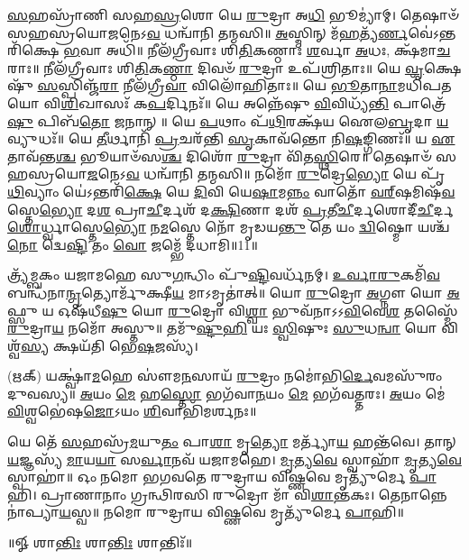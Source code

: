 \-\ul{𑌸}\-𑌹𑌸𑍍𑌰𑌾᳴𑌣𑌿 𑌸𑌹\-\ul{𑌸𑍍𑌰}\-𑌶𑍋 𑌯𑍇 \ul{𑌰𑍁}\-𑌦𑍍𑌰𑌾 𑌅\-\ul{𑌧𑌿} 𑌭𑍂𑌮𑍍𑌯𑌾॑𑌮𑍍। 𑌤𑍇𑌷𑌾𑍞᳴ 𑌸𑌹𑌸𑍍𑌰𑌯𑍋\-\ul{𑌜}\-𑌨𑍇𑌽\-\ul{𑌵} 𑌧𑌨𑍍𑌵𑌾᳴𑌨𑌿 𑌤𑌨𑍍𑌮𑌸𑌿॥ \ul{𑌅}\-𑌸𑍍𑌮𑌿𑌨𑍍 𑌮᳴\-\ul{𑌹}\-𑌤𑍍𑌯᳴\-\ul{𑌰𑍍𑌣}\-𑌵𑍇॑\-𑌽𑌨𑍍𑌤𑌰𑌿᳴𑌕𑍍𑌷𑍇 \ul{𑌭}\-𑌵𑌾 𑌅𑌧𑌿᳴॥ 𑌨𑍀𑌲᳴𑌗𑍍𑌰𑍀𑌵𑌾𑌃 𑌶𑌿\-\ul{𑌤𑌿}\-𑌕𑌣𑍍𑌠𑌾𑌃॑ \ul{𑌶}\-𑌰𑍍𑌵𑌾 \ul{𑌅}\-𑌧𑌃, 𑌕𑍍𑌷᳴𑌮𑌾\-\ul{𑌚}\-𑌰𑌾𑌃॥ 𑌨𑍀𑌲᳴𑌗𑍍𑌰𑍀𑌵𑌾𑌃 𑌶𑌿\-\ul{𑌤𑌿}\-𑌕\-\ul{𑌣𑍍𑌠𑌾} 𑌦𑌿𑌵𑍞᳴ \ul{𑌰𑍁}\-𑌦𑍍𑌰𑌾 𑌉𑌪᳴𑌶𑍍𑌰𑌿𑌤𑌾𑌃॥ 𑌯𑍇 \ul{𑌵𑍃}\-𑌕𑍍𑌷𑍇𑌷𑍁᳴ \ul{𑌸}\-𑌸𑍍𑌪𑌿𑌞𑍍𑌜᳴\-\ul{𑌰𑌾} 𑌨𑍀𑌲᳴𑌗𑍍𑌰𑍀\-\ul{𑌵𑌾} 𑌵𑌿𑌲𑍋᳴𑌹𑌿𑌤𑌾𑌃॥ 𑌯𑍇 \ul{𑌭𑍂}\-𑌤𑌾\-\ul{𑌨𑌾}\-𑌮𑌧𑌿᳴𑌪𑌤𑌯𑍋 𑌵𑌿\-\ul{𑌶𑌿}\-𑌖𑌾𑌸𑌃᳴ 𑌕\-\ul{𑌪}\-𑌰𑍍𑌦𑌿𑌨𑌃᳴॥ 𑌯𑍇 𑌅𑌨𑍍𑌨𑍇᳴𑌷𑍁 \ul{𑌵𑌿}\-𑌵𑌿𑌧𑍍𑌯᳴\-\ul{𑌨𑍍𑌤𑌿} 𑌪𑌾𑌤𑍍𑌰𑍇᳴\-\ul{𑌷𑍁} 𑌪𑌿𑌬᳴\-\ul{𑌤𑍋} 𑌜𑌨𑌾𑌨𑍍॥ 𑌯𑍇 \ul{𑌪}\-𑌥𑌾𑌂 𑌪᳴\-\ul{𑌥𑌿}\-𑌰𑌕𑍍𑌷᳴𑌯 𑌐𑌲\-\ul{𑌬𑍃}\-𑌦𑌾 \ul{𑌯}\-𑌵𑍍𑌯𑍁𑌧𑌃᳴॥ 𑌯𑍇 \ul{𑌤𑍀}\-𑌰𑍍𑌥𑌾𑌨𑌿᳴ \ul{𑌪𑍍𑌰}\-𑌚𑌰᳴𑌨𑍍𑌤𑌿 \ul{𑌸𑍃}\-𑌕𑌾𑌵᳴𑌨𑍍𑌤𑍋 𑌨𑌿\-\ul{𑌷}\-𑌙𑍍𑌗𑌿𑌣𑌃᳴॥ 𑌯 \ul{𑌏}\-𑌤𑌾𑌵᳴𑌨𑍍𑌤\-\ul{𑌶𑍍𑌚} 𑌭𑍂𑌯𑌾𑍞᳴𑌸\-\ul{𑌶𑍍𑌚} 𑌦𑌿𑌶𑍋᳴ \ul{𑌰𑍁}\-𑌦𑍍𑌰𑌾 𑌵𑌿᳴𑌤\-\ul{𑌸𑍍𑌥𑌿}\-𑌰𑍇॥ 𑌤𑍇𑌷𑌾𑍞᳴ 𑌸𑌹𑌸𑍍𑌰𑌯𑍋\-\ul{𑌜}\-𑌨𑍇𑌽\-\ul{𑌵} 𑌧𑌨𑍍𑌵𑌾᳴𑌨𑌿 𑌤𑌨𑍍𑌮𑌸𑌿॥ 𑌨𑌮𑍋᳴ \ul{𑌰𑍁}\-𑌦𑍍𑌰𑍇\-\ul{𑌭𑍍𑌯𑍋} 𑌯𑍇 𑌪𑍃᳴\-\ul{𑌥𑌿}\-𑌵𑍍𑌯𑌾𑌂 𑌯𑍇॑𑌽𑌨𑍍𑌤𑌰𑌿᳴\-\ul{𑌕𑍍𑌷𑍇} 𑌯𑍇 \ul{𑌦𑌿}\-𑌵𑌿 𑌯𑍇\-\ul{𑌷𑌾}\-𑌮\-\ul{𑌨𑍍𑌨𑌂} 𑌵𑌾𑌤𑍋᳴ \ul{𑌵}\-\ul{𑌰𑍍}‌𑌷𑌮𑌿𑌷᳴\-\ul{𑌵}\-𑌸𑍍𑌤𑍇\-\ul{𑌭𑍍𑌯𑍋} 𑌦\-\ul{𑌶} 𑌪𑍍𑌰𑌾\-\ul{𑌚𑍀}\-𑌰𑍍𑌦𑌶᳴ 𑌦\-\ul{𑌕𑍍𑌷𑌿}\-𑌣𑌾 𑌦𑌶᳴ \ul{𑌪𑍍𑌰}\-𑌤𑍀\-\ul{𑌚𑍀}\-𑌰𑍍𑌦𑌶𑍋\-𑌦𑍀᳴\-\ul{𑌚𑍀}\-𑌰𑍍𑌦\-\ul{𑌶𑍋}\-𑌰𑍍𑌧𑍍𑌵𑌾𑌸𑍍𑌤𑍇\-\ul{𑌭𑍍𑌯𑍋} 𑌨\-\ul{𑌮}\-𑌸𑍍𑌤𑍇 𑌨𑍋᳴ 𑌮𑍃𑌡𑌯\-\ul{𑌨𑍍𑌤𑍁} 𑌤𑍇 𑌯𑌂 \ul{𑌦𑍍𑌵𑌿}\-𑌷𑍍𑌮𑍋 𑌯𑌶𑍍𑌚᳴ \ul{𑌨𑍋} 𑌦𑍍𑌵𑍇\-\ul{𑌷𑍍𑌟𑌿} 𑌤𑌂 \ul{𑌵𑍋} 𑌜𑌮𑍍𑌭𑍇᳴ 𑌦𑌧𑌾𑌮𑌿॥11॥ 

\lbrack 𑌤𑍍𑌰𑍍𑌯᳴𑌮𑍍𑌬𑌕𑌂 𑌯𑌜𑌾𑌮𑌹𑍇 𑌸𑍁\-\ul{𑌗}\-𑌨𑍍𑌧𑌿𑌂 𑌪𑍁᳴\-\ul{𑌷𑍍𑌟𑌿}\-𑌵𑌰𑍍𑌧᳴𑌨𑌮𑍍। \ul{𑌉}\-\-\ul{𑌰𑍍𑌵𑌾}\-\-\ul{𑌰𑍁}\-𑌕𑌮𑌿᳴\-\ul{𑌵} 𑌬𑌨𑍍𑌧᳴𑌨𑌾\-\ul{𑌨𑍍𑌮𑍃}\-𑌤𑍍𑌯𑍋𑌰𑍍𑌮𑍁᳴𑌕𑍍𑌷𑍀\-\ul{𑌯} 𑌮𑌾𑌽𑌮𑍃𑌤𑌾॑𑌤𑍍॥ 𑌯𑍋 \ul{𑌰𑍁}\-𑌦𑍍𑌰𑍋 \ul{𑌅}\-𑌗𑍍𑌨𑍗 𑌯𑍋 \ul{𑌅}\-𑌫𑍍𑌸𑍁 𑌯 𑌓𑌷᳴𑌧𑍀\-\ul{𑌷𑍁} 𑌯𑍋 \ul{𑌰𑍁}\-𑌦𑍍𑌰𑍋 𑌵𑌿\-\ul{𑌶𑍍𑌵𑌾} 𑌭𑍁𑌵᳴𑌨𑌾𑌽𑌽\-\ul{𑌵𑌿}\-𑌵𑍇\-\ul{𑌶} 𑌤𑌸𑍍𑌮𑍈᳴ \ul{𑌰𑍁}\-𑌦𑍍𑌰𑌾\-\ul{𑌯} 𑌨𑌮𑍋᳴ 𑌅𑌸𑍍𑌤𑍁॥ 𑌤𑌮𑍁᳴\-\ul{𑌷𑍍𑌟𑍁}\-\-\ul{𑌹𑌿} 𑌯𑌃 \ul{𑌸𑍍𑌵𑌿}\-𑌷𑍁𑌃 \ul{𑌸𑍁}\-𑌧\-\ul{𑌨𑍍𑌵𑌾} 𑌯𑍋 𑌵𑌿𑌶𑍍𑌵᳴\-\ul{𑌸𑍍𑌯} 𑌕𑍍𑌷𑌯᳴𑌤𑌿 𑌭𑍇\-\ul{𑌷}\-𑌜𑌸𑍍𑌯᳴। 

(𑌋𑌕𑍍)   𑌯𑌕𑍍𑌷𑍍𑌵𑌾॑\-\ul{𑌮}\-𑌹𑍇 𑌸𑍗॑𑌮\-\ul{𑌨}\-𑌸𑌾𑌯᳴ \ul{𑌰𑍁}\-𑌦𑍍𑌰𑌂 𑌨𑌮𑍋॑𑌭𑌿\-\ul{𑌰𑍍𑌦𑍇}\-𑌵𑌮𑌸𑍁᳴𑌰𑌂 𑌦𑍁𑌵𑌸𑍍𑌯॥ \ul{𑌅}\-𑌯𑌂 \ul{𑌮𑍇} 𑌹\-\ul{𑌸𑍍𑌤𑍋} 𑌭𑌗᳴𑌵𑌾\-\ul{𑌨}\-𑌯𑌂 \ul{𑌮𑍇} 𑌭𑌗᳴𑌵𑌤𑍍𑌤𑌰𑌃। \ul{𑌅}\-𑌯𑌂 𑌮𑍇॑ \ul{𑌵𑌿}\-𑌶𑍍𑌵𑌭𑍇॑𑌷\-\ul{𑌜𑍋}\-𑌽𑌯𑌂 \ul{𑌶𑌿}\-𑌵𑌾𑌭𑌿᳴𑌮𑌰𑍍𑌶𑌨𑌃॥

𑌯𑍇 𑌤𑍇᳴ \ul{𑌸}\-𑌹𑌸𑍍𑌰᳴\-\ul{𑌮}\-𑌯𑍁\-\ul{𑌤𑌂} 𑌪𑌾\-\ul{𑌶𑌾} 𑌮𑍃\-\ul{𑌤𑍍𑌯𑍋} 𑌮𑌰𑍍𑌤𑍍𑌯𑌾᳴\-\ul{𑌯} 𑌹𑌨𑍍𑌤᳴𑌵𑍇। 𑌤𑌾𑌨𑍍 \ul{𑌯}\-𑌜𑍍𑌞𑌸𑍍𑌯᳴ \ul{𑌮𑌾}\-𑌯\-\ul{𑌯𑌾} 𑌸\-\ul{𑌰𑍍𑌵𑌾}\-𑌨𑌵᳴ 𑌯𑌜𑌾𑌮𑌹𑍇। \ul{𑌮𑍃}\-𑌤𑍍𑌯\-\ul{𑌵𑍇} 𑌸𑍍𑌵𑌾𑌹𑌾᳴ \ul{𑌮𑍃}\-𑌤𑍍𑌯\-\ul{𑌵𑍇} 𑌸𑍍𑌵𑌾𑌹𑌾॑॥ 𑌓𑌂 𑌨𑌮𑍋 𑌭𑌗𑌵𑌤𑍇 𑌰𑍁𑌦𑍍𑌰𑌾𑌯 𑌵𑌿𑌷𑍍𑌣𑌵𑍇 𑌮𑍃𑌤𑍍𑌯𑍁᳴𑌰𑍍𑌮𑍇 \ul{𑌪𑌾}\-𑌹𑌿। 𑌪𑍍𑌰𑌾𑌣𑌾𑌨𑌾𑌂 𑌗𑍍𑌰𑌨𑍍𑌥𑌿𑌰𑌸𑌿 𑌰𑍁𑌦𑍍𑌰𑍋 𑌮𑌾᳴ 𑌵𑌿\-\ul{𑌶𑌾}\-𑌨𑍍𑌤𑌕𑌃। 𑌤𑍇𑌨𑌾𑌨𑍍𑌨𑍇𑌨𑌾॑𑌪𑍍𑌯𑌾\-\ul{𑌯}\-𑌸𑍍𑌵॥ 𑌨𑌮𑍋 𑌰𑍁𑌦𑍍𑌰𑌾𑌯 𑌵𑌿𑌷𑍍𑌣𑌵𑍇 𑌮𑍃𑌤𑍍𑌯𑍁᳴𑌰𑍍𑌮𑍇 \ul{𑌪𑌾}\-𑌹𑌿॥\rbrack
 
\centerline{॥𑍐 𑌶𑌾\-\ul{𑌨𑍍𑌤𑌿𑌃} 𑌶𑌾\-\ul{𑌨𑍍𑌤𑌿𑌃} 𑌶𑌾𑌨𑍍𑌤𑌿𑌃᳴॥}

